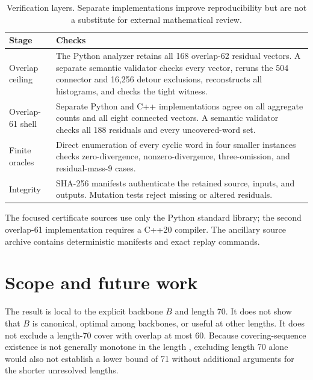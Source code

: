 \documentclass[11pt]{article}
\theoremstyle{definition}
\theoremstyle{remark}
\begin{document}
\begin{table}[ht]
\centering
\begin{tabular}{@{}p{}p{}@{}}
\toprule
Stage & Checks\\
\midrule
Overlap ceiling &
The Python analyzer retains all 168 overlap-62 residual vectors.
A separate semantic validator checks every vector, reruns the 504
connector and 16,256 detour exclusions, reconstructs all histograms,
and checks the tight witness.\\
Overlap-61 shell &
Separate Python and C++ implementations agree on all aggregate counts
and all eight connected vectors.  A semantic validator checks all 188
residuals and every uncovered-word set.\\
Finite oracles &
Direct enumeration of every cyclic word in four smaller instances
checks zero-divergence, nonzero-divergence, three-omission, and
residual-mass-9 cases.\\
Integrity &
SHA-256 manifests authenticate the retained source, inputs, and
outputs.  Mutation tests reject missing or altered residuals.\\
\bottomrule
\end{tabular}
\caption{Verification layers.  Separate implementations improve
reproducibility but are not a substitute for external mathematical
review.}
\label{tab:verification}
\end{table}

The focused certificate sources use only the Python standard library;
the second overlap-61 implementation requires a C++20 compiler.  The
ancillary source archive contains deterministic manifests and exact
replay commands.

\section{Scope and future work}

The result is local to the explicit backbone $B$ and length 70.  It does
not show that $B$ is canonical, optimal among backbones, or useful at
other lengths.  It does not exclude a length-70 cover with overlap at
most 60.  Because covering-sequence existence is not generally monotone
in the length \cite{chung-cooper}, excluding length 70 alone would also
not establish a lower bound of 71 without additional arguments for the
shorter unresolved lengths.
\end{document}
